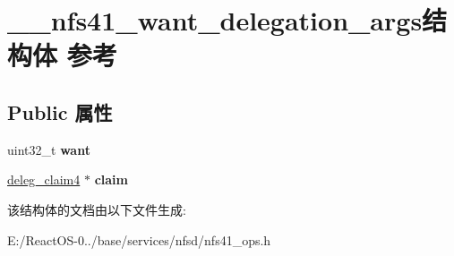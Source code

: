 \hypertarget{struct____nfs41__want__delegation__args}{}\section{\+\_\+\+\_\+nfs41\+\_\+want\+\_\+delegation\+\_\+args结构体 参考}
\label{struct____nfs41__want__delegation__args}
\subsection*{Public 属性}
\begin{DoxyCompactItemize}
\item 
\mbox{\label{struct____nfs41__want__delegation__args_a96d15ddef4d140b108b09de791df8c7d}} 
uint32\+\_\+t {\bfseries want}
\item 
\mbox{\label{struct____nfs41__want__delegation__args_a3b51821ed535b7f391436ea3c318dbdf}} 
\hyperlink{struct____deleg__claim4}{deleg\+\_\+claim4} $\ast$ {\bfseries claim}
\end{DoxyCompactItemize}


该结构体的文档由以下文件生成\+:\begin{DoxyCompactItemize}
\item 
E\+:/\+React\+O\+S-\/0../base/services/nfsd/nfs41\+\_\+ops.\+h\end{DoxyCompactItemize}
